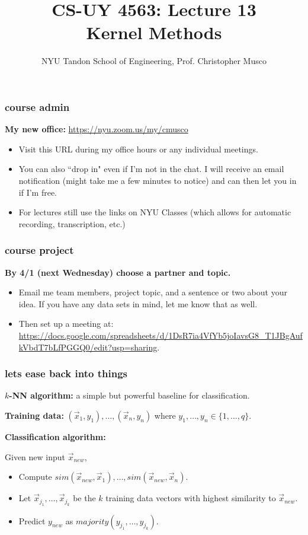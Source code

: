 \documentclass[handout,compress]{beamer}
\title{CS-UY 4563: Lecture 13 \\ Kernel Methods}
\author{NYU Tandon School of Engineering, Prof. Christopher Musco}
\date{}
\begin{document}
\begin{frame}
	\titlepage 
\end{frame}


\begin{frame}
	\frametitle{course admin}
	\textbf{My new office:} \url{https://nyu.zoom.us/my/cmusco}
	\begin{itemize}
		\item Visit this URL during my office hours or any individual meetings.
		\item You can also ``drop in" even if I'm not in the chat. I will receive an email notification (might take me a few minutes to notice) and can then let you in if I'm free.
		\item For lectures still use the links on NYU Classes (which allows for automatic recording, transcription, etc.)
	\end{itemize}
\end{frame}

\begin{frame}
		\frametitle{course project}
			\textbf{By 4/1 (next Wednesday)  choose a partner and topic.}

			\begin{itemize}
				\item Email me team members, project topic, and a sentence or two about your idea. If you have any data sets in mind, let me know that as well.
				\item Then set up a meeting at: \footnotesize{\url{https://docs.google.com/spreadsheets/d/1DsR7ia4VfYb5joIavsG8_T1JBgAufkVbdT7bLfPGGQ0/edit?usp=sharing}}.
			\end{itemize}
\end{frame}


\begin{frame}
	\frametitle{lets ease back into things}
	\textbf{$k$-NN algorithm:} a simple but powerful baseline for classification.
	
	\textbf{Training data:} $(\vec{x}_1, y_1), \ldots, (\vec{x}_n, y_n)$ where $y_1, \ldots, y_n \in \{1,\ldots, q\}$. 
	
	\textbf{Classification algorithm:}
	
	Given new input $\vec{x}_{new}$,
	\begin{itemize}
		\item Compute $sim(\vec{x}_{new}, \vec{x}_1), \ldots, sim(\vec{x}_{new}, \vec{x}_n).$
		\item Let $\vec{x}_{j_1}, \ldots, \vec{x}_{j_k}$ be the $k$ training data vectors with highest similarity to $\vec{x}_{new}$. 
		\item Predict $y_{new}$ as $majority(y_{j_1}, \ldots, y_{j_k})$.
	\end{itemize}
\end{frame}
\end{document}
